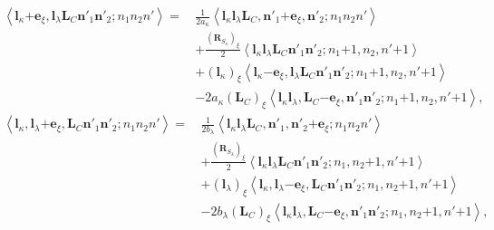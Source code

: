 \documentclass[a4paper,11pt,twoside,openright]{book}
\begin{document}
\begin{align}
  \left\langle\boldsymbol{l}_{\kappa}\mathrm{+}\boldsymbol{e}_{\xi},%
    \boldsymbol{l}_{\lambda}\boldsymbol{L}_{C}%
    \boldsymbol{n}'_{1}\boldsymbol{n}'_{2};n_{1}n_{2}n'\right\rangle
  =\,&\frac{1}{2a_{\kappa}}%
    \left\langle\boldsymbol{l}_{\kappa}\boldsymbol{l}_{\lambda}\boldsymbol{L}_{C},%
    \boldsymbol{n}'_{1}\mathrm{+}\boldsymbol{e}_{\xi},\boldsymbol{n}'_{2};n_{1}n_{2}n'\right\rangle\\
  &+\frac{(\boldsymbol{R}_{S_{\kappa}})_{\xi}}{2}%
    \left\langle\boldsymbol{l}_{\kappa}\boldsymbol{l}_{\lambda}\boldsymbol{L}_{C}%
    \boldsymbol{n}'_{1}\boldsymbol{n}'_{2};n_{1}\mathrm{+}1,n_{2},n'\mathrm{+}1\right\rangle\nonumber\\
  &+(\boldsymbol{l}_{\kappa})_{\xi}%
    \left\langle\boldsymbol{l}_{\kappa}\mathrm{-}\boldsymbol{e}_{\xi},\boldsymbol{l}_{\lambda}\boldsymbol{L}_{C}%
    \boldsymbol{n}'_{1}\boldsymbol{n}'_{2};n_{1}\mathrm{+}1,n_{2},n'\mathrm{+}1\right\rangle\nonumber\\
  &-2a_{\kappa}(\boldsymbol{L}_{C})_{\xi}%
    \left\langle\boldsymbol{l}_{\kappa}\boldsymbol{l}_{\lambda},\boldsymbol{L}_{C}\mathrm{-}\boldsymbol{e}_{\xi},%
    \boldsymbol{n}'_{1}\boldsymbol{n}'_{2};n_{1}\mathrm{+}1,n_{2},n'\mathrm{+}1\right\rangle,\nonumber
\end{align}
%
\begin{align}
  \left\langle\boldsymbol{l}_{\kappa},\boldsymbol{l}_{\lambda}\mathrm{+}\boldsymbol{e}_{\xi},%
    \boldsymbol{L}_{C}\boldsymbol{n}'_{1}\boldsymbol{n}'_{2};n_{1}n_{2}n'\right\rangle
  =\,&\frac{1}{2b_{\lambda}}%
    \left\langle\boldsymbol{l}_{\kappa}\boldsymbol{l}_{\lambda}\boldsymbol{L}_{C},%
    \boldsymbol{n}'_{1},\boldsymbol{n}'_{2}\mathrm{+}\boldsymbol{e}_{\xi};n_{1}n_{2}n'\right\rangle\\
  &+\frac{(\boldsymbol{R}_{S_{\lambda}})_{\xi}}{2}%
    \left\langle\boldsymbol{l}_{\kappa}\boldsymbol{l}_{\lambda}\boldsymbol{L}_{C}%
    \boldsymbol{n}'_{1}\boldsymbol{n}'_{2};n_{1},n_{2}\mathrm{+}1,n'\mathrm{+}1\right\rangle\nonumber\\
  &+(\boldsymbol{l}_{\lambda})_{\xi}%
    \left\langle\boldsymbol{l}_{\kappa},\boldsymbol{l}_{\lambda}\mathrm{-}\boldsymbol{e}_{\xi},\boldsymbol{L}_{C}%
    \boldsymbol{n}'_{1}\boldsymbol{n}'_{2};n_{1},n_{2}\mathrm{+}1,n'\mathrm{+}1\right\rangle\nonumber\\
  &-2b_{\lambda}(\boldsymbol{L}_{C})_{\xi}%
    \left\langle\boldsymbol{l}_{\kappa}\boldsymbol{l}_{\lambda},\boldsymbol{L}_{C}\mathrm{-}\boldsymbol{e}_{\xi},%
    \boldsymbol{n}'_{1}\boldsymbol{n}'_{2};n_{1},n_{2}\mathrm{+}1,n'\mathrm{+}1\right\rangle,\nonumber
\end{align}
\end{document}
